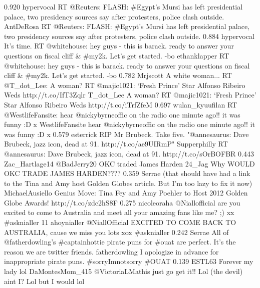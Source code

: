 {0.920}
{\joinNameTweet
{hypervocal}
{RT @Reuters: FLASH: \#Egypt's Mursi has left presidential palace, two presidency sources say after protesters, police clash outside.}}
{\joinNameTweet
{AntDeRosa}
{RT @Reuters: FLASH: \#Egypt's Mursi has left presidential palace, two presidency sources say after protesters, police clash outside.}}
{0.884}
{\joinNameTweet
{hypervocal}
{It's time. RT @whitehouse: hey guys - this is barack.  ready to answer your questions on fiscal cliff \& \#my2k.  Let's get started. -bo}}
{\joinNameTweet
{ethanklapper}
{RT @whitehouse: hey guys - this is barack.  ready to answer your questions on fiscal cliff \& \#my2k.  Let's get started. -bo}}
{0.782}
{\joinNameTweet
{Mrjscott}
{A white woman... RT @T\_dot\_Lee: A woman? RT @majic1021: ‘Fresh Prince' Star Alfonso Ribeiro Weds http://t.co/IfT3Zqlr}}
{\joinNameTweet
{T\_dot\_Lee}
{A woman? RT @majic1021: ‘Fresh Prince' Star Alfonso Ribeiro Weds http://t.co/iTrfZfeM}}
{0.697}
{\joinNameTweet
{wulan\_kyuufilan}
{RT @WestlifeFansite: hear @nickybyrneoffic on the radio one minute ago!! it was funny :D x}}
{\joinNameTweet
{WestlifeFansite}
{hear @nickybyrneoffic on the radio one minute ago!! it was funny :D x}}
{0.579}
{\joinNameTweet
{esterrick}
{RIP Mr Brubeck. Take five. "@annesaurus: Dave Brubeck, jazz icon, dead at 91. http://t.co/ae9UIRmP"}}
{\joinNameTweet
{Supperphilly}
{RT @annesaurus: Dave Brubeck, jazz icon, dead at 91. http://t.co/sOrBOFBR}}
{0.443}
{\joinNameTweet
{Zac\_Hartlage14}
{@BadJerry20 OKC traded James Harden}}
{\joinNameTweet
{24\_Jag}
{Why WOULD OKC TRADE JAMES HARDEN????}}
{0.359}
{\joinNameTweet
{Serrae}
{(that should have had a link to the Tina and Amy host Golden Globes article. But I'm too lazy to fix it now)}}
{\joinNameTweet
{MichaelAusiello}
{Genius Move: Tina Fey and Amy Poehler to Host 2012 Golden Globe Awards! http://t.co/zdc2hS8F}}
{0.275}
{\joinNameTweet
{nicoleoraha}
{@Niallofficial are you excited to come to Australia and meet all your amazing fans like me? ;) xx \#asknialler 11}}
{\joinNameTweet
{ahoynialler}
{@NiallOfficial EXCITED TO COME BACK TO AUSTRALIA, cause we miss you lots xox \#asknialler}}
{0.242}
{\joinNameTweet
{Serrae}
{All of @fatherdowling's \#captainhottie pirate puns for \#ouat are perfect. It's the reason we are twitter friends.}}
{\joinNameTweet
{fatherdowling}
{I apologize in advance for inappropriate pirate puns. \#sorryImnotsorry \#OUAT}}
{0.139}
{\joinNameTweet
{ESTL63}
{Forever my lady lol}}
{\joinNameTweet
{DaMontesMom\_415}
{@VictoriaLMathis just go get it!! Lol (the devil) aint I? Lol but I would lol}}
